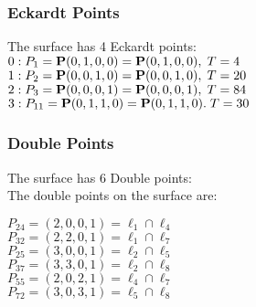 \documentclass{article}
\newcommand{\bP}{{\bf P}}
\begin{document}
{\subsubsection*{Eckardt Points}
The surface has 4 Eckardt points:\\
$0 : P_{1}=\bP(0, 1, 0, 0) = \bP(0, 1, 0, 0),\; T= 4$\\
$1 : P_{2}=\bP(0, 0, 1, 0) = \bP(0, 0, 1, 0),\; T= 20$\\
$2 : P_{3}=\bP(0, 0, 0, 1) = \bP(0, 0, 0, 1),\; T= 84$\\
$3 : P_{11}=\bP(0, 1, 1, 0) = \bP(0, 1, 1, 0).\; T= 30$\\
\subsubsection*{Double Points}
The surface has 6 Double points:\\
The double points on the surface are:\\
\begin{multicols}{2}
\noindent
$P_{24} = ( 2, 0, 0, 1 ) = \ell_{1} \cap \ell_{4} $\\
$P_{32} = ( 2, 2, 0, 1 ) = \ell_{1} \cap \ell_{7} $\\
$P_{25} = ( 3, 0, 0, 1 ) = \ell_{2} \cap \ell_{5} $\\
$P_{37} = ( 3, 3, 0, 1 ) = \ell_{2} \cap \ell_{8} $\\
$P_{55} = ( 2, 0, 2, 1 ) = \ell_{4} \cap \ell_{7} $\\
$P_{72} = ( 3, 0, 3, 1 ) = \ell_{5} \cap \ell_{8} $\\
\end{multicols}
}
\end{document}
